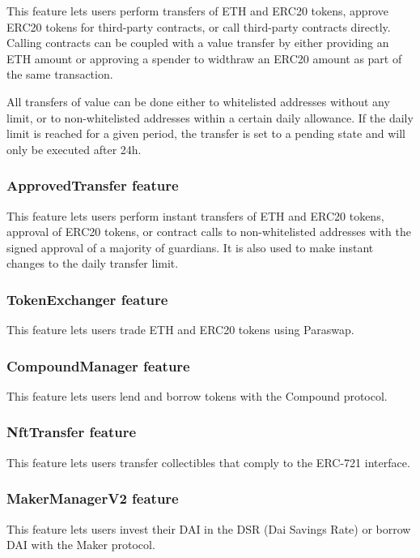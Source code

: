 \documentclass[12pt]{article}
\begin{document}
This feature lets users perform transfers of ETH and ERC20 tokens, approve ERC20 tokens for third-party contracts, or call third-party contracts directly. Calling contracts can be coupled with a value transfer by either providing an ETH amount or approving a spender to widthraw an ERC20 amount as part of the same transaction.

All transfers of value can be done either to whitelisted addresses without any limit, or to non-whitelisted addresses within a certain daily allowance. If the daily limit is reached for a given period, the transfer is set to a pending state and will only be executed after 24h.

\subsubsection{ApprovedTransfer feature}

This feature lets users perform instant transfers of ETH and ERC20 tokens, approval of ERC20 tokens, or contract calls to non-whitelisted addresses with the signed approval of a majority of guardians. It is also used to make instant changes to the daily transfer limit.

\subsubsection{TokenExchanger feature}

This feature lets users trade ETH and ERC20 tokens using Paraswap.

\subsubsection{CompoundManager feature}

This feature lets users lend and borrow tokens with the Compound protocol. 

\subsubsection{NftTransfer feature}

This feature lets users transfer collectibles that comply to the ERC-721 interface.  

\subsubsection{MakerManagerV2 feature}

This feature lets users invest their DAI in the DSR (Dai Savings Rate) or borrow DAI with the Maker protocol. 
\end{document}
